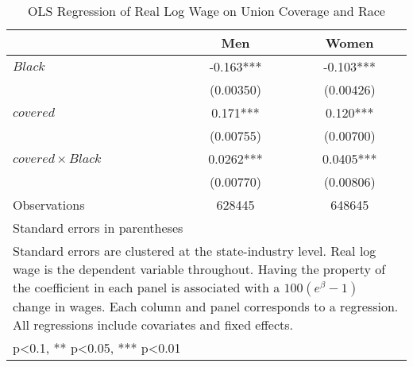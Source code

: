 \begin{table}[htbp]\centering
\def\sym#1{\ifmmode^{#1}\else\(^{#1}\)\fi}
\caption{OLS Regression of Real Log Wage on Union Coverage and Race}
\begin{tabular}{l*{2}{c}}
\hline\hline
                    &\multicolumn{1}{c}{Men}&\multicolumn{1}{c}{Women}\\
\hline
$ Black $           &      -0.163***&      -0.103***\\
                    &   (0.00350)   &   (0.00426)   \\
[1em]
$ covered $         &       0.171***&       0.120***\\
                    &   (0.00755)   &   (0.00700)   \\
[1em]
$ covered \times Black $&      0.0262***&      0.0405***\\
                    &   (0.00770)   &   (0.00806)   \\
\hline
Observations        &      628445   &      648645   \\
\hline\hline
\multicolumn{3}{l}{\footnotesize Standard errors in parentheses}\\
\multicolumn{3}{l}{\footnotesize Standard errors are clustered at the state-industry level. Real log wage is the dependent variable throughout. Having the property of the coefficient in each panel is associated with a $ 100(e^\beta - 1) $ change in wages. Each column and panel corresponds to a regression. All regressions include covariates and fixed effects. }\\
\multicolumn{3}{l}{\footnotesize * p<0.1, ** p<0.05, *** p<0.01}\\
\end{tabular}
\end{table}
